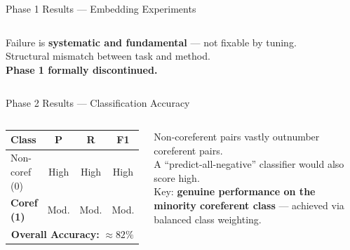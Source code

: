 \documentclass[aspectratio=169]{beamer}
\begin{document}
\begin{frame}{Phase 1 Results — Embedding Experiments}
\begin{columns}[T]
      \vspace{6pt}
      \begin{tcolorbox}[rbox={Phase 1 Conclusion}]
        \small
        Failure is \textbf{systematic and fundamental}
        — not fixable by tuning.\\[3pt]
        Structural mismatch between task and method.\\[3pt]
        \textbf{Phase 1 formally discontinued.}
      \end{tcolorbox}
  \end{columns}
\end{frame}

\begin{frame}{Phase 2 Results — Classification Accuracy}
  \begin{columns}[T]
      \begin{tcolorbox}[nbox={Pairwise Classification (5-Fold CV)}]
        \small
        \renewcommand{\arraystretch}{1.4}
        \begin{tabular}{lccc}
          \toprule
          \textbf{Class} & \textbf{P} & \textbf{R} & \textbf{F1}\\
          \midrule
          Non-coref (0) & High & High & High\\
          \textcolor{accentorange}{\textbf{Coref (1)}} & Mod. & Mod. & Mod.\\
          \midrule
          \multicolumn{4}{c}{\textbf{Overall Accuracy:}
            \textcolor{accentorange}{\Large\textbf{${\approx}82\%$}}}\\
          \bottomrule
        \end{tabular}
      \end{tcolorbox}

      \vspace{6pt}
      \begin{tcolorbox}[nbox={Interpreting 82\%}]
        \small
        Non-coreferent pairs vastly outnumber
        coreferent pairs.\\[3pt]
        A ``predict-all-negative'' classifier
        would also score high.\\[3pt]
        Key: \textbf{genuine performance on the
        minority coreferent class} — achieved
        via balanced class weighting.
      \end{tcolorbox}


\end{columns}
\end{frame}
\end{document}
